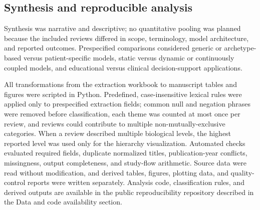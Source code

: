 \subsection{Synthesis and reproducible analysis}

Synthesis was narrative and descriptive; no quantitative pooling was planned because the included reviews differed in scope, terminology, model architecture, and reported outcomes. Prespecified comparisons considered generic or archetype-based versus patient-specific models, static versus dynamic or continuously coupled models, and educational versus clinical decision-support applications.

All transformations from the extraction workbook to manuscript tables and figures were scripted in Python. Predefined, case-insensitive lexical rules were applied only to prespecified extraction fields; common null and negation phrases were removed before classification, each theme was counted at most once per review, and reviews could contribute to multiple non-mutually-exclusive categories. When a review described multiple biological levels, the highest reported level was used only for the hierarchy visualization. Automated checks evaluated required fields, duplicate normalized titles, publication-year conflicts, missingness, output completeness, and study-flow arithmetic. Source data were read without modification, and derived tables, figures, plotting data, and quality-control reports were written separately. Analysis code, classification rules, and derived outputs are available in the public reproducibility repository described in the Data and code availability section.
